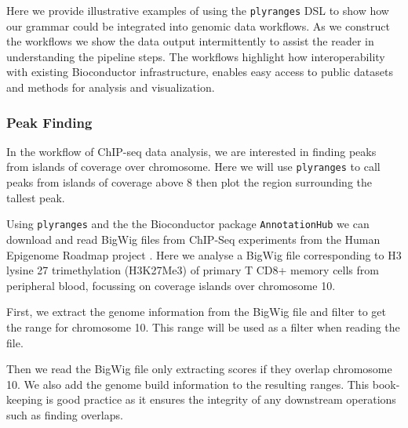 \documentclass[]{article}
\newenvironment{Shaded}{\begin{snugshade}}{\end{snugshade}}
\newcommand{\KeywordTok}[1]{\textcolor[rgb]{0.13,0.29,0.53}{\textbf{#1}}}
\newcommand{\StringTok}[1]{\textcolor[rgb]{0.31,0.60,0.02}{#1}}
\newcommand{\OperatorTok}[1]{\textcolor[rgb]{0.81,0.36,0.00}{\textbf{#1}}}
\newcommand{\NormalTok}[1]{#1}
\begin{document}
Here we provide illustrative examples of using the \texttt{plyranges}
DSL to show how our grammar could be integrated into genomic data
workflows. As we construct the workflows we show the data output
intermittently to assist the reader in understanding the pipeline steps.
The workflows highlight how interoperability with existing Bioconductor
infrastructure, enables easy access to public datasets and methods for
analysis and visualization.

\subsubsection{Peak Finding}\label{peak-finding}

In the workflow of ChIP-seq data analysis, we are interested in finding
peaks from islands of coverage over chromosome. Here we will use
\texttt{plyranges} to call peaks from islands of coverage above 8 then
plot the region surrounding the tallest peak.

Using \texttt{plyranges} and the the Bioconductor package
\texttt{AnnotationHub} \cite{R-ahub} we can download and read BigWig
files from ChIP-Seq experiments from the Human Epigenome Roadmap project
\cite{Roadmap-Epigenomics-Consortium2015-pr}. Here we analyse a BigWig
file corresponding to H3 lysine 27 trimethylation (H3K27Me3) of primary
T CD8+ memory cells from peripheral blood, focussing on coverage islands
over chromosome 10.

First, we extract the genome information from the BigWig file and filter
to get the range for chromosome 10. This range will be used as a filter
when reading the file.

\begin{Shaded}
\end{Shaded}

Then we read the BigWig file only extracting scores if they overlap
chromosome 10. We also add the genome build information to the resulting
ranges. This book-keeping is good practice as it ensures the integrity
of any downstream operations such as finding overlaps.
\end{document}
